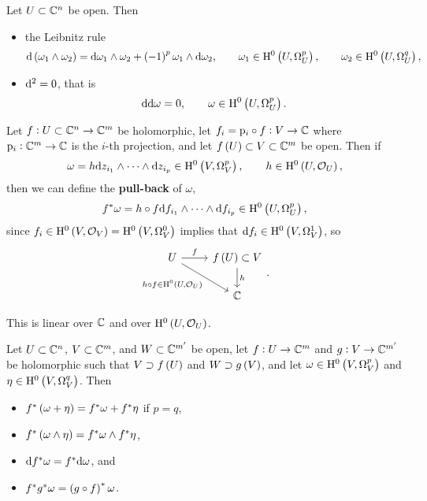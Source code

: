 \begin{proposition}
Let $ U \subset \mathbb{C}^n $ be open. Then
\begin{itemize}
\item the Leibnitz rule
$$ \d\br{\omega_1 \wedge \omega_2} = \d\omega_1 \wedge \omega_2 + \br{-1}^p \omega_1 \wedge \d\omega_2, \qquad \omega_1 \in \H^0\br{U, \Omega_U^p}, \qquad \omega_2 \in \H^0\br{U, \Omega_U^q}, $$
\item $ \mathrm{d}^2 = 0 $, that is
$$ \d\d\omega = 0, \qquad \omega \in \H^0\br{U, \Omega_U^p}. $$
\end{itemize}
\end{proposition}

\pagebreak

\begin{definition}
Let $ f : U \subset \mathbb{C}^n \to \mathbb{C}^m $ be holomorphic, let $ f_i = \mathrm{p}_i \circ f : V \to \mathbb{C} $ where $ \mathrm{p}_i : \mathbb{C}^m \to \mathbb{C} $ is the $ i $-th projection, and let $ f\br{U} \subset V \subset \CC^m $ be open. Then if
$$ \omega = h \d z_{i_1} \wedge \dots \wedge \d z_{i_p} \in \H^0\br{V, \Omega_V^p}, \qquad h \in \H^0\br{U, \OOO_U}, $$
then we can define the \textbf{pull-back} of $ \omega $,
$$ f^*\omega = h \circ f \d f_{i_1} \wedge \dots \wedge \d f_{i_p} \in \H^0\br{U, \Omega_U^p}, $$
since $ f_i \in \H^0\br{V, \OOO_V} = \H^0\br{V, \Omega_V^0} $ implies that $ \d f_i \in \H^0\br{V, \Omega_V^1} $, so
$$
\begin{tikzcd}
U \arrow{r}{f} \arrow[swap]{dr}{h \circ f \in \H^0\br{U, \OOO_U}} & f\br{U} \subset V \arrow{d}{h} \\
& \CC
\end{tikzcd}.
$$
\end{definition}

This is linear over $ \mathbb{C} $ and over $ \H^0\br{U, \OOO_U} $.

\begin{proposition}
Let $ U \subset \mathbb{C}^n $, $ V \subset \mathbb{C}^m $, and $ W \subset \mathbb{C}^{m'} $ be open, let $ f : U \to \mathbb{C}^m $ and $ g : V \to \mathbb{C}^{m'} $ be holomorphic such that $ V \supset f\br{U} $ and $ W \supset g\br{V} $, and let $ \omega \in \H^0\br{V, \Omega_V^p} $ and $ \eta \in \H^0\br{V, \Omega_V^q} $. Then
\begin{itemize}
\item $ f^*\br{\omega + \eta} = f^*\omega + f^*\eta $ if $ p = q $,
\item $ f^*\br{\omega \wedge \eta} = f^*\omega \wedge f^*\eta $,
\item $ \mathrm{d} f^*\omega = f^*\mathrm{d}\omega $, and
\item $ f^*g^*\omega = \br{g \circ f}^*\omega $.
\end{itemize}
\end{proposition}

